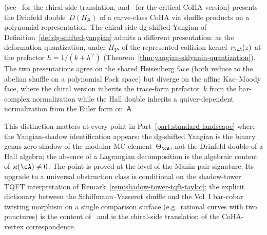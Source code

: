 \begin{remark}
\begin{enumerate}[label=\textup{(\roman*)}]
 \textup{(}see~\cite{Latyntsev23} for the chiral-side translation,
 and~\cite{Jindal-Kaubrys-Latyntsev2603} for the critical CoHA
 version\textup{)} presents the Drinfeld double~$D(H_{\mathsf A})$
 of a curve-class CoHA via shuffle products on a polynomial
 representation. The chiral-side dg-shifted Yangian of
 \textup{Definition~\ref{def:dg-shifted-yangian}} admits a
 different presentation: as the deformation quantization, under
 $H_Y$, of the represented collision kernel~$r_\cA(z)$ at the
 prefactor $\hbar=1/(k+h^\vee)$
 \textup{(}Theorem~\ref{thm:yangian-sklyanin-quantization}\textup{)}.
 The two presentations agree on the shared Heisenberg face
 \textup{(}both reduce to the abelian shuffle on a
 polynomial Fock space\textup{)} but diverge on the
 affine Kac--Moody face, where the chiral version inherits
 the trace-form prefactor~$k$ from the bar-complex normalization
 while the Hall double inherits a quiver-dependent
 normalization from the Euler form on~$\mathsf A$.
\end{enumerate}
This distinction matters at every point in
Part~\ref{part:standard-landscape} where the Yangian-shadow
identification appears: the dg-shifted Yangian is the binary
genus-zero shadow of the modular MC element~$\Theta_\cA$, not the
Drinfeld double of a Hall algebra; the absence of a Lagrangian
decomposition is the algebraic content of $\varkappa(\cA) \neq 0$.
The point is proved at the level of the Manin-pair signature. Its
upgrade to a universal obstruction class is conditional on the
shadow-tower TQFT interpretation of
Remark~\ref{rem:shadow-tower-tqft-taylor}; the explicit dictionary between the
Schiffmann--Vasserot shuffle and the Vol~I bar-cobar twisting morphism
on a single comparison surface (e.g.\ rational curves with two
punctures) is the content
of~\cite{Latyntsev23} and is the chiral-side translation of the
CoHA-vertex correspondence.
\end{remark}

